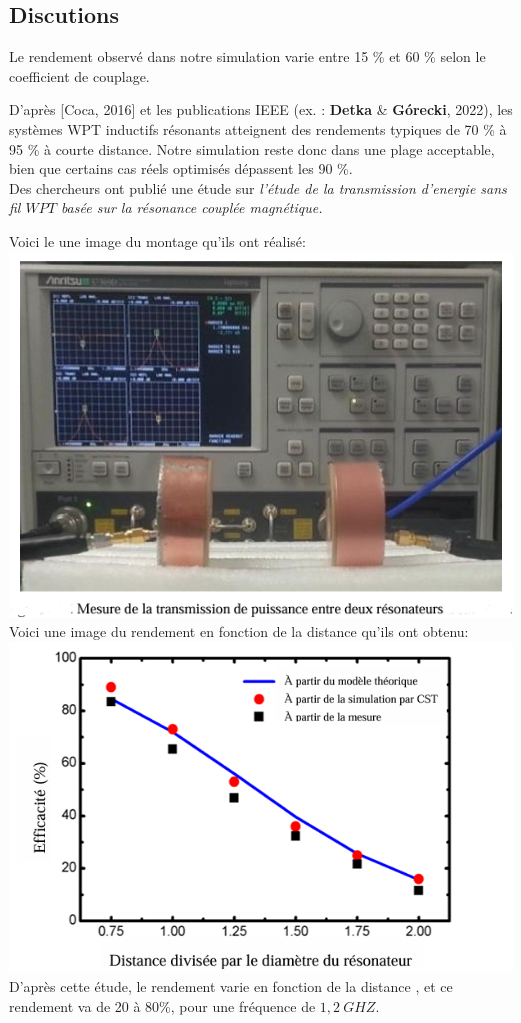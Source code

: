 \documentclass[12pt,a4paper,titlepage,notitlepage]{article}
\begin{document}
	
	\subsection{Discutions}
	
	Le rendement observé dans notre simulation varie entre 15 \% et 60 \% selon le coefficient de couplage.
	
	D’après [Coca, 2016] et les publications IEEE (ex. : \textbf{Detka} \& \textbf{Górecki}, 2022), les systèmes WPT inductifs résonants atteignent des rendements typiques de 70 \% à 95 \% à courte distance.
	Notre simulation reste donc dans une plage acceptable, bien que certains cas réels optimisés dépassent les 90 \%.\\
	
	Des chercheurs ont publié une étude sur \textit{l'étude de la transmission d'energie sans fil $WPT$ basée sur la résonance couplée magnétique.}
	
	Voici le une image du montage qu'ils ont réalisé:\\
	\includegraphics[width=1\textwidth]{WPT_disc}\\
	
	
	Voici une image du rendement en fonction de la distance qu'ils ont obtenu:\\
	\includegraphics[width=1\textwidth]{WPT_disc_1}\\
	D'après cette étude, le rendement varie en fonction de la distance , et ce rendement va de 20 à 80\%, pour une fréquence de $1,2 \ GHZ$.  
	
\end{document}
